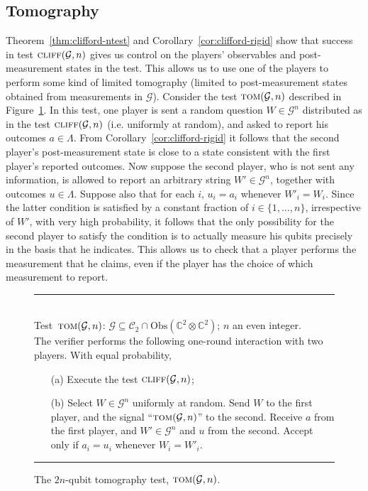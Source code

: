 \documentclass[11pt]{article}
\theoremstyle{remark}
\theoremstyle{definition}
\newcommand{\C}{\ensuremath{\mathbb{C}}}
\newcommand{\setft}[1]{\mathrm{#1}}
\newcommand{\Obs}{\setft{Obs}}
\newcommand{\pbt}{\textsc{pbt}}
\newcommand{\cliff}{\textsc{cliff}}
\newcommand{\tom}{\textsc{tom}}
\newcommand{\cliffordgb}{{\mathcal{C}_2}}
\begin{document}
\subsection{Tomography}

Theorem~\ref{thm:clifford-ntest} and Corollary~\ref{cor:clifford-rigid} show that success in test $\cliff(\mathcal{G},n)$ gives us control on the players' observables and post-measurement states in the test. This allows us to use one of the players to perform some kind of limited tomography (limited to post-measurement states obtained from measurements in $\mathcal{G}$). Consider the test $\tom(\mathcal{G},n)$ described in Figure~\ref{fig:tomography-test}. In this test, one player is sent a random question $W\in\mathcal{G}^n$ distributed as in the test $\cliff(\mathcal{G},n)$ (i.e. uniformly at random), and asked to report his outcomes $a\in\Lambda$. From  Corollary~\ref{cor:clifford-rigid} it follows that the second player's post-measurement state is close to a state consistent with the first player's reported outcomes. Now suppose the second player, who is not sent any information, is allowed to report an arbitrary string $W'\in \mathcal{G}^n$, together with outcomes $u\in\Lambda$. Suppose also that for each $i$, $u_i=a_i$ whenever $W'_i=W_i$. Since the latter condition is satisfied by a constant fraction of $i\in\{1,\ldots,n\}$, irrespective of $W'$, with very high probability, it follows that the only possibility for the second player to satisfy the condition is to actually measure his qubits precisely in the basis that he indicates. This allows us to check that a player performs the measurement that he claims, even if the player has the choice of which measurement to report. 

\begin{figure}[H]
\rule[1ex]{\textwidth}{0.5pt}\\
Test~$\tom(\mathcal{G},n)$: $\mathcal{G} \subseteq \cliffordgb \cap \Obs(\C^2\otimes \C^2)$; $n$ an even integer.  \\
The verifier performs the following one-round interaction with two
players.  With equal probability,
\begin{enumerate}
\item[(a)] Execute the test $\cliff(\mathcal{G},n)$; 
\item[(b)] Select $W\in\mathcal{G}^n$ uniformly at random. Send $W$ to the first player, and the signal ``$\tom(\mathcal{G},n)$'' to the second. Receive $a$ from the first player, and $W'\in\mathcal{G}^n$ and $u$ from the second. Accept only if $a_i=u_i$ whenever $W_i=W'_i$. 
\end{enumerate}
\rule[2ex]{\textwidth}{0.5pt}\vspace{-1cm}
\caption{The $2n$-qubit tomography test, $\tom(\mathcal{G},n)$.}
\label{fig:tomography-test}
\end{figure} 
\end{document}

